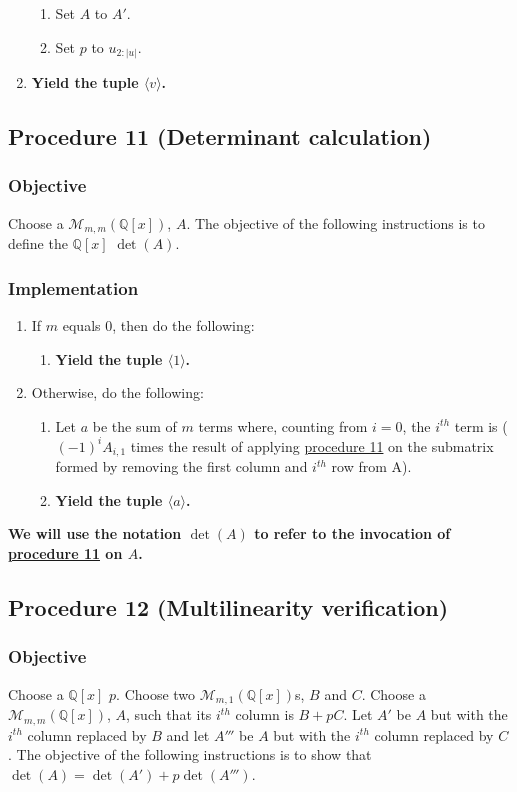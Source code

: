 \documentclass[twocolumn]{article}
\begin{document}
\begin{enumerate}
\begin{enumerate}
						\item Set $A$ to $A'$.
						\item Set $p$ to $u_{2:\lvert u\rvert}$.
					\end{enumerate}
					\item \textbf{Yield the tuple $\langle v\rangle$.}
				\end{enumerate}
		\subsection{Procedure 11 (Determinant calculation)}\label{sec:procedure 11}
			\subsubsection{Objective}
				Choose a $\mathcal{M}_{m,m}(\mathbb{Q}[x])$, $A$. The objective of the following instructions is to define the $\mathbb{Q}[x]$ $\det(A)$.
			\subsubsection{Implementation}
				\begin{enumerate}
					\item If $m$ equals $0$, then do the following:
					\begin{enumerate}
						\item \textbf{Yield the tuple $\langle 1\rangle$.}
					\end{enumerate}
					\item Otherwise, do the following:
					\begin{enumerate}
						\item Let $a$ be the sum of $m$ terms where, counting from $i=0$, the $i^{th}$ term is ($(-1)^{i}A_{i,1}$ times the result of applying \hyperref[sec:procedure 11]{procedure 11} on the submatrix formed by removing the first column and $i^{th}$ row from A).
						\item \textbf{Yield the tuple $\langle a\rangle$.}
					\end{enumerate}
				\end{enumerate}
			\textbf{We will use the notation $\det(A)$ to refer to the invocation of \hyperref[sec:procedure 11]{procedure 11} on $A$.}
		\subsection{Procedure 12 (Multilinearity verification)}\label{sec:procedure 12}
			\subsubsection{Objective}
				Choose a $\mathbb{Q}[x]$ $p$. Choose two $\mathcal{M}_{m,1}(\mathbb{Q}[x])$s, $B$ and $C$. Choose a $\mathcal{M}_{m,m}(\mathbb{Q}[x])$, $A$, such that its $i^{th}$ column is $B+pC$. Let $A'$ be $A$ but with the $i^{th}$ column replaced by $B$ and let $A'''$ be $A$ but with the $i^{th}$ column replaced by $C$. The objective of the following instructions is to show that $\det(A)=\det(A') + p\det(A''')$.
\end{document}
